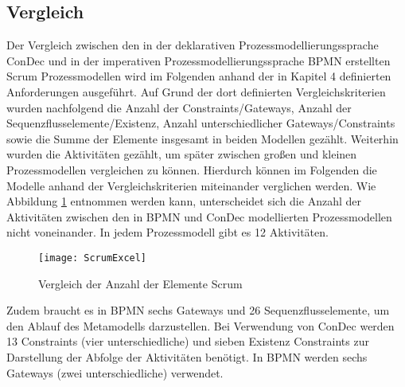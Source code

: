 \subsection{Vergleich}

Der Vergleich zwischen den in der deklarativen Prozessmodellierungssprache ConDec und in der imperativen Prozessmodellierungssprache BPMN erstellten Scrum Prozessmodellen wird im Folgenden anhand der in Kapitel 4 definierten Anforderungen ausgeführt. Auf Grund der dort definierten Vergleichskriterien wurden nachfolgend die Anzahl der Constraints/Gateways, Anzahl der Sequenzflusselemente/Existenz, Anzahl unterschiedlicher Gateways/Constraints sowie die Summe der Elemente insgesamt in beiden Modellen gezählt. Weiterhin wurden die Aktivitäten gezählt, um später zwischen großen und kleinen Prozessmodellen vergleichen zu können. Hierdurch können im Folgenden die Modelle anhand der Vergleichskriterien miteinander verglichen werden. \newline
Wie Abbildung \ref{fig:ScrumExcel} entnommen werden kann, unterscheidet sich die Anzahl der Aktivitäten zwischen den in BPMN und ConDec modellierten Prozessmodellen nicht voneinander. In jedem Prozessmodell gibt es 12 Aktivitäten.\newline

\begin{figure}[htp]
\begin{center}
  \texttt{[image: ScrumExcel]} %
  \caption{Vergleich der Anzahl der Elemente Scrum}
  \label{fig:ScrumExcel}
\end{center}
\end{figure}


Zudem braucht es in BPMN sechs Gateways und 26 Sequenzflusselemente, um den Ablauf des Metamodells darzustellen. Bei Verwendung von ConDec werden 13 Constraints (vier unterschiedliche) und sieben Existenz Constraints zur Darstellung der Abfolge der Aktivitäten benötigt. In BPMN werden sechs Gateways (zwei unterschiedliche) verwendet.\newline

